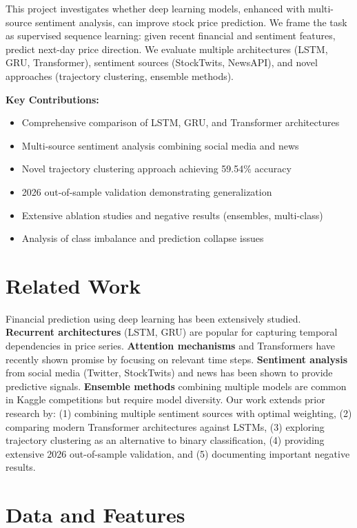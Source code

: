 \documentclass[10pt,twocolumn]{article}
\begin{document}
This project investigates whether deep learning models, enhanced with multi-source sentiment analysis, can improve stock price prediction. We frame the task as supervised sequence learning: given recent financial and sentiment features, predict next-day price direction. We evaluate multiple architectures (LSTM, GRU, Transformer), sentiment sources (StockTwits, NewsAPI), and novel approaches (trajectory clustering, ensemble methods).

\textbf{Key Contributions:}
\begin{itemize}
\item Comprehensive comparison of LSTM, GRU, and Transformer architectures
\item Multi-source sentiment analysis combining social media and news
\item Novel trajectory clustering approach achieving 59.54\% accuracy
\item 2026 out-of-sample validation demonstrating generalization
\item Extensive ablation studies and negative results (ensembles, multi-class)
\item Analysis of class imbalance and prediction collapse issues
\end{itemize}

\section{Related Work}

Financial prediction using deep learning has been extensively studied. \textbf{Recurrent architectures} (LSTM, GRU) are popular for capturing temporal dependencies in price series. \textbf{Attention mechanisms} and Transformers have recently shown promise by focusing on relevant time steps. \textbf{Sentiment analysis} from social media (Twitter, StockTwits) and news has been shown to provide predictive signals. \textbf{Ensemble methods} combining multiple models are common in Kaggle competitions but require model diversity. Our work extends prior research by: (1) combining multiple sentiment sources with optimal weighting, (2) comparing modern Transformer architectures against LSTMs, (3) exploring trajectory clustering as an alternative to binary classification, (4) providing extensive 2026 out-of-sample validation, and (5) documenting important negative results.

\section{Data and Features}
\end{document}
